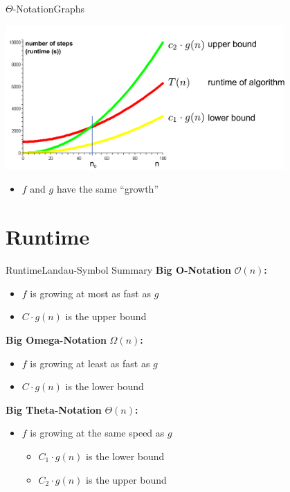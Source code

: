 \begin{frame}{$\Theta$-Notation}{Graphs}
     \begin{center}
       \includegraphics[width=0.8\textwidth]{Images/lower-upper-bound.pdf}
  \end{center}
  \begin{itemize}
  \item $f$ and $g$ have the same ``growth''
  \end{itemize}
\end{frame}

\section{Runtime}


\begin{frame}{Runtime}{Landau-Symbol Summary}
  \textbf{Big O-Notation} $\mathcal{O}(n)$\textbf{:}\\
    \begin{itemize}
      \item
        $f$ is growing {\color{Mittel-Blau}at most} as fast as $g$
      \item
        $C \cdot g(n)$ is the upper bound
    \end{itemize}
  \textbf{Big Omega-Notation} $\Omega(n)$\textbf{:}\\
  \begin{itemize}
    \item
      $f$ is growing {\color{Mittel-Blau}at least} as fast as $g$
    \item
      $C \cdot g(n)$ is the lower bound
  \end{itemize}
  \textbf{Big Theta-Notation} $\Theta(n)$\textbf{:}\\
  \begin{itemize}
    \item
      $f$ is growing at {\color{Mittel-Blau}the same} speed as $g$
      \begin{itemize}
        \item
          $C_1 \cdot g(n)$ is the lower bound
        \item
          $C_2 \cdot g(n)$ is the upper bound
      \end{itemize}
  \end{itemize}
\end{frame}

